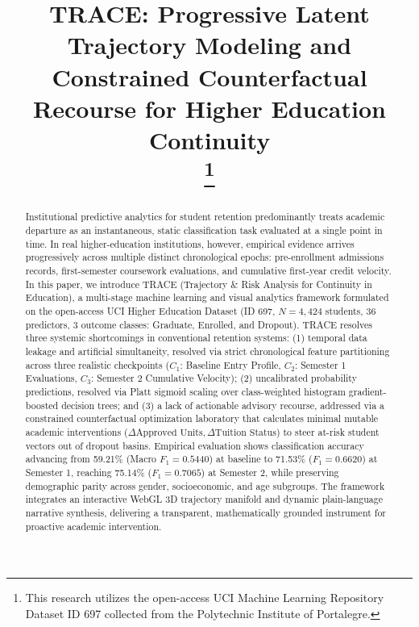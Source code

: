 \documentclass[conference]{IEEEtran}
\begin{document}
\title{TRACE: Progressive Latent Trajectory Modeling and Constrained Counterfactual Recourse for Higher Education Continuity\\
\thanks{This research utilizes the open-access UCI Machine Learning Repository Dataset ID 697 collected from the Polytechnic Institute of Portalegre.}
}

\author{
}

\maketitle

\begin{abstract}
Institutional predictive analytics for student retention predominantly treats academic departure as an instantaneous, static classification task evaluated at a single point in time. In real higher-education institutions, however, empirical evidence arrives progressively across multiple distinct chronological epochs: pre-enrollment admissions records, first-semester coursework evaluations, and cumulative first-year credit velocity. In this paper, we introduce TRACE (Trajectory \& Risk Analysis for Continuity in Education), a multi-stage machine learning and visual analytics framework formulated on the open-access UCI Higher Education Dataset (ID 697, $N=4,424$ students, 36 predictors, 3 outcome classes: Graduate, Enrolled, and Dropout). TRACE resolves three systemic shortcomings in conventional retention systems: (1) temporal data leakage and artificial simultaneity, resolved via strict chronological feature partitioning across three realistic checkpoints ($C_1$: Baseline Entry Profile, $C_2$: Semester 1 Evaluations, $C_3$: Semester 2 Cumulative Velocity); (2) uncalibrated probability predictions, resolved via Platt sigmoid scaling over class-weighted histogram gradient-boosted decision trees; and (3) a lack of actionable advisory recourse, addressed via a constrained counterfactual optimization laboratory that calculates minimal mutable academic interventions ($\Delta\text{Approved Units}, \Delta\text{Tuition Status}$) to steer at-risk student vectors out of dropout basins. Empirical evaluation shows classification accuracy advancing from 59.21\% (Macro $F_1 = 0.5440$) at baseline to 71.53\% ($F_1 = 0.6620$) at Semester 1, reaching 75.14\% ($F_1 = 0.7065$) at Semester 2, while preserving demographic parity across gender, socioeconomic, and age subgroups. The framework integrates an interactive WebGL 3D trajectory manifold and dynamic plain-language narrative synthesis, delivering a transparent, mathematically grounded instrument for proactive academic intervention.
\end{abstract}
\end{document}
